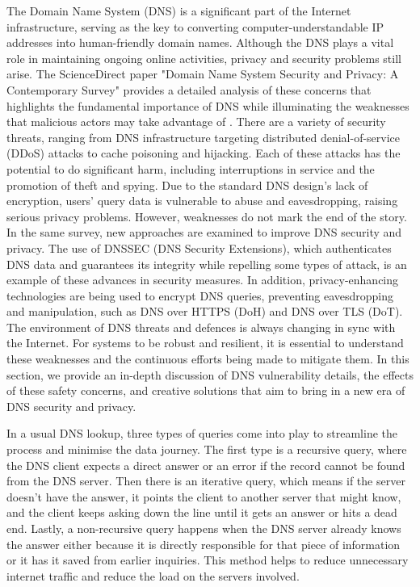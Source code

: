 The Domain Name System (DNS) is a significant part of the Internet infrastructure, serving as the key to converting computer-understandable IP addresses into human-friendly domain names. Although the DNS plays a vital role in maintaining ongoing online activities, privacy and security problems still arise. The ScienceDirect paper "Domain Name System Security and Privacy: A Contemporary Survey" provides a detailed analysis of these concerns that highlights the fundamental importance of DNS while illuminating the weaknesses that malicious actors may take advantage of \cite * {Sciencedirect2023dns}. There are a variety of security threats, ranging from DNS infrastructure targeting distributed denial-of-service (DDoS) attacks to cache poisoning and hijacking. Each of these attacks has the potential to do significant harm, including interruptions in service and the promotion of theft and spying. Due to the standard DNS design's lack of encryption, users' query data is vulnerable to abuse and eavesdropping, raising serious privacy problems. However, weaknesses do not mark the end of the story. In the same survey, new approaches are examined to improve DNS security and privacy. The use of DNSSEC (DNS Security Extensions), which authenticates DNS data and guarantees its integrity while repelling some types of attack, is an example of these advances in security measures. In addition, privacy-enhancing technologies are being used to encrypt DNS queries, preventing eavesdropping and manipulation, such as DNS over HTTPS (DoH) and DNS over TLS (DoT). The environment of DNS threats and defences is always changing in sync with the Internet. For systems to be robust and resilient, it is essential to understand these weaknesses and the continuous efforts being made to mitigate them. In this section, we provide an in-depth discussion of DNS vulnerability details, the effects of these safety concerns, and creative solutions that aim to bring in a new era of DNS security and privacy.

In a usual DNS lookup, three types of queries come into play to streamline the process and minimise the data journey. The first type is a recursive query, where the DNS client expects a direct answer or an error if the record cannot be found from the DNS server. Then there is an iterative query, which means if the server doesn't have the answer, it points the client to another server that might know, and the client keeps asking down the line until it gets an answer or hits a dead end. Lastly, a non-recursive query happens when the DNS server already knows the answer either because it is directly responsible for that piece of information or it has it saved from earlier inquiries. This method helps to reduce unnecessary internet traffic and reduce the load on the servers involved.

